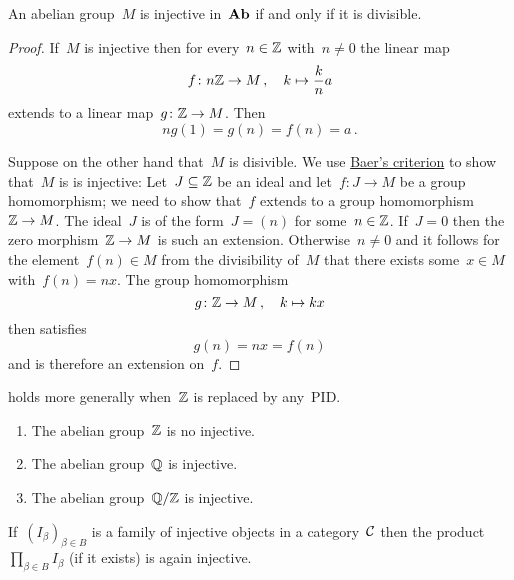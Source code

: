 \begin{corollary}
  \label{injective iff divisible}
  An abelian group~$M$ is injective in~$\mathbf{Ab}$ if and only if it is divisible.
\end{corollary}


\begin{proof}
  If~$M$ is injective then for every~$n \in \mathbb{Z}$ with~$n \neq 0$ the linear map
  \[
    f
    \colon
    n\mathbb{Z}
    \to
    M \,,
    \quad
    k
    \mapsto
    \frac{k}{n} a
  \]
  extends to a linear map~$g \colon \mathbb{Z} \to M$.
  Then
  \[
    n g(1)
    =
    g(n)
    =
    f(n)
    =
    a \,.
  \]
  
  Suppose on the other hand that~$M$ is disivible.
  We use \hyperref[baers criterion]{Baer’s criterion} to show that~$M$ is is injective:
  Let~$J \subseteq \mathbb{Z}$ be an ideal and let~$f \colon J \to M$ be a group homomorphism;
  we need to show that~$f$ extends to a group homomorphism~$\mathbb{Z} \to M$.
  The ideal~$J$ is of the form~$J = (n)$ for some~$n \in \mathbb{Z}$.
  If~$J = 0$ then the zero morphism~$\mathbb{Z} \to M$ is such an extension.
  Otherwise~$n \neq 0$ and it follows for the element~$f(n) \in M$ from the divisibility of~$M$ that there exists some~$x \in M$ with~$f(n) = n x$.
  The group homomorphism
  \[
    g
    \colon
    \mathbb{Z}
    \to
    M \,,
    \quad
    k
    \mapsto
    k x
  \]
  then satisfies
  \[
    g(n)
    =
    n x
    =
    f(n)
  \]
  and is therefore an extension on~$f$.
\end{proof}


\begin{remark}
   holds more generally when~$\mathbb{Z}$ is replaced by any~PID.
\end{remark}


\begin{example}
  \leavevmode
  \begin{enumerate}
    \item
      The abelian group~$\mathbb{Z}$ is no injective.
    \item
      The abelian group~$\mathbb{Q}$ is injective.
    \item
      The abelian group~$\mathbb{Q}/\mathbb{Z}$ is injective.
  \end{enumerate}
\end{example}


\begin{lemma}
  \label{product of injectives}
  If~$(I_\beta)_{\beta \in B}$ is a family of injective objects in a category~$\mathcal{C}$ then the product~$\prod_{\beta \in B} I_\beta$ (if it exists) is again injective.
\end{lemma}



